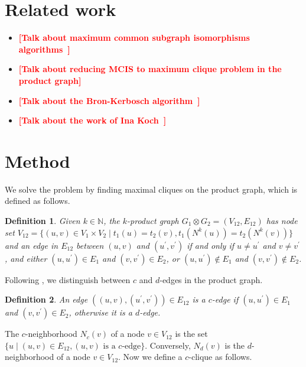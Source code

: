 \documentclass[11pt]{article}
\newcommand{\todo}[1]{\xspace{\bfseries\sffamily\textcolor{red}{[#1]}}\xspace}
\newtheorem{definition}{Definition}[section]
\begin{document}
\section{Related work}

\begin{itemize}
  \item \todo{Talk about maximum common subgraph isomorphisms
    algorithms~\cite{Raymond:2002ug}}
  \item \todo{Talk about reducing MCIS to maximum clique problem in the product
    graph}
  \item \todo{Talk about the Bron-Kerbosch algorithm~\cite{Bron:1973tk}}
  \item \todo{Talk about the work of Ina Koch~\cite{Koch:2001wi}}
\end{itemize}

\section{Method}

We solve the problem by finding maximal cliques on the product graph, which is
defined as follows.

\begin{definition}
Given $k \in \mathbb{N}$, the \emph{$k$-product graph} $G_1 \otimes G_2 =
(V_{12}, E_{12})$ has node set $V_{12} = \{(u,v) \in V_1 \times V_2 \mid t_1(u)
= t_2(v), t_1(N^k(u)) = t_2(N^k(v)) \}$ and an edge in $E_{12}$ between $(u,v)$
and $(u^\prime,v^\prime)$ if and only if $u \neq u^\prime$ and $v \neq
v^\prime$, and either $(u,u^\prime) \in E_1$ and $(v,v^\prime) \in E_2$, or
$(u,u^\prime) \not \in E_1$ and $(v,v^\prime) \not \in E_2$.
\end{definition}

Following \cite{Koch:2001wi}, we distinguish between $c$ and $d$-edges in the
product graph.

\begin{definition}
An edge $((u,v),(u^\prime,v^\prime)) \in E_{12}$ is a \emph{$c$-edge} if
$(u,u^\prime) \in E_1$ and $(v,v^\prime) \in E_2$, otherwise it is a
\emph{$d$-edge}.
\end{definition}

The $c$-neighborhood $N_c(v)$ of a node $v \in V_{12}$ is the set $\{ u
\mid (u,v) \in E_{12}, (u,v) \mbox{ is a $c$-edge} \}$. Conversely, $N_d(v)$ is
the $d$-neighborhood of a node $v \in V_{12}$.
Now we define a $c$-clique as follows.
\end{document}
